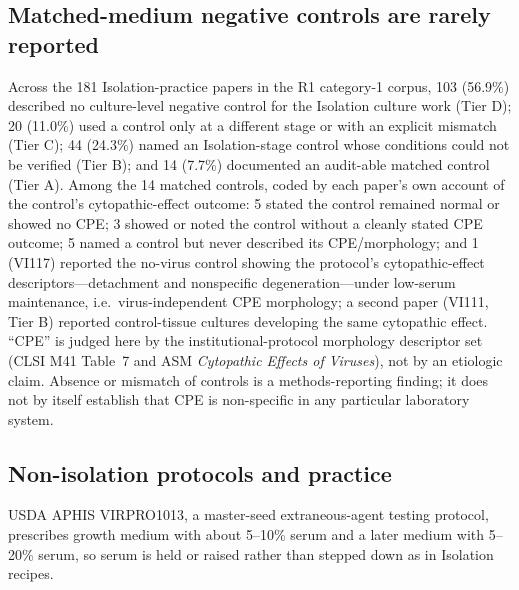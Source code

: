 \subsection*{Matched-medium negative controls are rarely reported}
Across the 181 Isolation-practice papers in the R1 category-1 corpus, 103 (56.9\%) described no culture-level negative control for the Isolation culture work (Tier D); 20 (11.0\%) used a control only at a different stage or with an explicit mismatch (Tier C); 44 (24.3\%) named an Isolation-stage control whose conditions could not be verified (Tier B); and 14 (7.7\%) documented an audit-able matched control (Tier A). Among the 14 matched controls, coded by each paper's own account of the control's cytopathic-effect outcome: 5 stated the control remained normal or showed no CPE; 3 showed or noted the control without a cleanly stated CPE outcome; 5 named a control but never described its CPE/morphology; and 1 (VI117) reported the no-virus control showing the protocol's cytopathic-effect descriptors---detachment and nonspecific degeneration---under low-serum maintenance, i.e.\ virus-independent CPE morphology; a second paper (VI111, Tier B) reported control-tissue cultures developing the same cytopathic effect. ``CPE'' is judged here by the institutional-protocol morphology descriptor set (CLSI M41 Table~7 and ASM \emph{Cytopathic Effects of Viruses}), not by an etiologic claim. Absence or mismatch of controls is a methods-reporting finding; it does not by itself establish that CPE is non-specific in any particular laboratory system.

\subsection*{Non-isolation protocols and practice}
USDA APHIS VIRPRO1013, a master-seed extraneous-agent testing protocol, prescribes growth medium with about 5--10\% serum and a later medium with 5--20\% serum, so serum is held or raised rather than stepped down as in Isolation recipes. 

